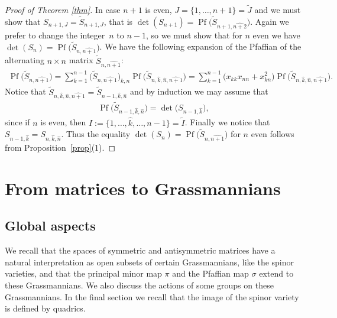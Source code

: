 \documentclass[10pt,a4paper]{amsart}
\newcommand{\tI}{{\tilde{I}}}
\newcommand{\tJ}{{\tilde{J}}}
\newcommand{\tS}{{\tilde{S}}}
\numberwithin{equation}{section}
\begin{document}
\begin{proof}[Proof of Theorem \ref{thm}]
In case $n+1$ is even, $J=\{1,\ldots,n+1\}=\tJ$ and we must show that $S_{n+1,{J}}=\tS_{n+1,{J}}$, that is $\det(S_{n+1})=\operatorname{Pf}\big(\tS_{n+1,\widehat{n+2}}\big)$. Again we prefer to change the integer~$n$ to $n-1$, so we must show that for $n$ even we have $\det(S_{n})=\operatorname{Pf}\big(\tS_{n,\widehat{n+1}}\big)$. We have the following expansion of the Pfaffian of the alternating $n\times n$ matrix $\tS_{n,\widehat{n+1}}$:
\begin{gather*}
\operatorname{Pf}\big(\tS_{n,\widehat{n+1}}\big) =
\sum_{k=1}^{n-1}\big(\tS_{n,\widehat{n+1}}\big)_{k,n}\operatorname{Pf}\big(\tS_{n,\hat{k},\hat{n},\widehat{n+1}}\big) =
\sum_{k=1}^{n-1} \big(x_{kk}x_{nn}+x_{kn}^2\big)\operatorname{Pf}\big(\tS_{n,\hat{k},\hat{n},\widehat{n+1}}\big).
\end{gather*}
Notice that $\tS_{n,\hat{k},\hat{n},\widehat{n+1}}=\tS_{n-1,\hat{k},\hat{n}}$ and by induction we may assume that
\begin{gather*} \operatorname{Pf}\big(\tS_{n-1,\hat{k},\hat{n}}\big)= \det\big(S_{n-1,\hat{k}}\big),
\end{gather*} since if $n$ is even, then $I:=\big\{1,\ldots,\hat{k},\ldots,n-1\big\}=\tI$. Finally we notice that $S_{n-1,\hat{k}}=S_{n,\hat{k},\hat{n}}$. Thus the equality $\det(S_{n})=\operatorname{Pf}\big(\tS_{n,\widehat{n+1}}\big)$ for $n$ even follows from Proposition~\ref{prop}(1).
\end{proof}


\section{From matrices to Grassmannians}

\subsection{Global aspects}
We recall that the spaces of symmetric and antisymmetric matrices have a natural interpretation as open subsets of certain Grassmannians, like the spinor varieties, and that the principal minor map $\pi$ and the Pfaffian map $\sigma$ extend to these Grassmannians. We also discuss the actions of some groups on these Grassmannians. In the final section we recall that the image of the spinor variety is defined by quadrics.
\end{document}
